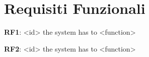 \section{Requisiti Funzionali}
\noindent

\textbf{RF1}: <id> the system has to <function>

\textbf{RF2}: <id> the system has to <function>